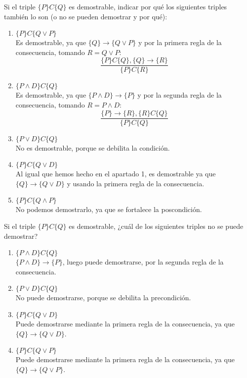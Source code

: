 \begin{ejercicio}
    Si el triple $\{P\} C \{Q\}$ es demostrable, indicar por qué los siguientes triples también lo son (o no se pueden demostrar y por qué):
    \begin{enumerate}
        \item $\{P\} C \{Q \lor P\}$\\
           Es demostrable, ya que $\{Q\}\rightarrow\{Q \lor P\}$ y por la primera regla de la consecuencia, tomando $R=Q \lor P$:
         \begin{equation*}
            \dfrac{\{P\}C\{Q\}, \{Q\}\rightarrow\{R\}}{\{P\}C\{R\}}
        \end{equation*}

        \item $\{P \land D\} C \{Q\}$\\
            Es demostrable, ya que $\{P \land D\}\rightarrow\{P\}$ y por la segunda regla de la consecuencia, tomando $R = P \land D$:
        \begin{equation*}
            \dfrac{\{P\}\rightarrow\{R\},\{R\}C\{Q\}}{\{P\}C\{Q\}}
        \end{equation*}
        \item $\{P \lor D\} C \{Q\}$\\
            No es demostrable, porque se debilita la condición.

        \item $\{P\} C \{Q \lor D\}$\\
            Al igual que hemos hecho en el apartado 1, es demostrable ya que ${\{Q\}\rightarrow\{Q \lor D\}}$ y usando la primera regla de la consecuencia.
        \item $\{P\} C \{Q \land P\}$\\
            No podemos demostrarlo, ya que se fortalece la poscondición.
    \end{enumerate}
\end{ejercicio}

\begin{ejercicio}
    Si el triple $\{P\} C \{Q\}$ es demostrable, ¿cuál de los siguientes triples no se puede demostrar?
    \begin{enumerate}
        \item $\{P \land D\} C \{Q\}$\\
            $\{P \land D\}\rightarrow\{P\}$, luego puede demostrarse, por la segunda regla de la consecuencia.
        \item $\{P \lor D\} C \{Q\}$\\
            No puede demostrarse, porque se debilita la precondición.
        \item $\{P\} C \{Q \lor D\}$\\
            Puede demostrarse mediante la primera regla de la consecuencia, ya que ${\{Q\}\rightarrow\{Q \lor D\}}$.

        \item $\{P\} C \{Q \lor P\}$\\
        Puede demostrarse mediante la primera regla de la consecuencia, ya que ${\{Q\}\rightarrow\{Q \lor P\}}$.
    \end{enumerate}
\end{ejercicio}

